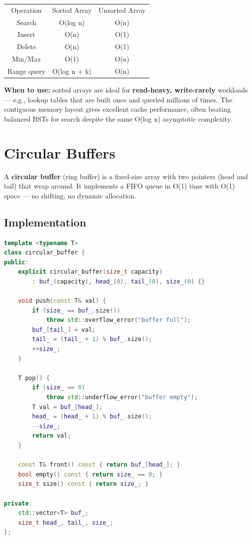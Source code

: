 \begin{center}
\begin{tabular}{ccc}
\toprule
Operation & Sorted Array & Unsorted Array \\
Search & O(log n) & O(n) \\
Insert & O(n) & O(1) \\
Delete & O(n) & O(1) \\
Min/Max & O(1) & O(n) \\
Range query & O(log n + k) & O(n) \\
\bottomrule
\end{tabular}
\end{center}

\textbf{When to use:} sorted arrays are ideal for \textbf{read-heavy, write-rarely} workloads — e.g., lookup tables that are built once and queried millions of times. The contiguous memory layout gives excellent cache performance, often beating balanced BSTs for search despite the same O(log n) asymptotic complexity.

\section{Circular Buffers}

A \textbf{circular buffer} (ring buffer) is a fixed-size array with two pointers (head and tail) that wrap around. It implements a FIFO queue in O(1) time with O(1) space — no shifting, no dynamic allocation.

\subsection{Implementation}

\begin{lstlisting}[language=C++]
template <typename T>
class circular_buffer {
public:
    explicit circular_buffer(size_t capacity)
        : buf_(capacity), head_(0), tail_(0), size_(0) {}

    void push(const T& val) {
        if (size_ == buf_.size())
            throw std::overflow_error("buffer full");
        buf_[tail_] = val;
        tail_ = (tail_ + 1) % buf_.size();
        ++size_;
    }

    T pop() {
        if (size_ == 0)
            throw std::underflow_error("buffer empty");
        T val = buf_[head_];
        head_ = (head_ + 1) % buf_.size();
        --size_;
        return val;
    }

    const T& front() const { return buf_[head_]; }
    bool empty() const { return size_ == 0; }
    size_t size() const { return size_; }

private:
    std::vector<T> buf_;
    size_t head_, tail_, size_;
};
\end{lstlisting}

